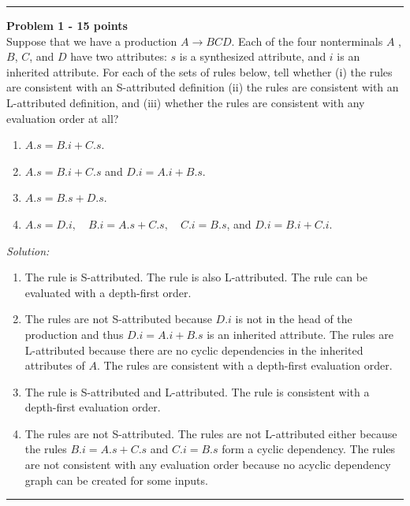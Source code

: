 \documentclass[a4paper, 11pt]{article}
\newenvironment{problem}[2][Problem]
    { \begin{mdframed}[backgroundcolor=gray!20] \textbf{#1 #2} \\}
    {  \end{mdframed}}
\newenvironment{solution}
    {\textit{Solution:}}
    {}
\begin{document}
\noindent\rule{7in}{2.8pt}
\begin{problem}{1 - 15 points}
Suppose that we have a production $A \rightarrow BCD$. Each of  the four nonterminals $A$ , $B$, $C$, and $D$ have two attributes: $s$ is a synthesized  attribute, and $i$ is an inherited attribute. For each of the sets of rules below,  tell whether (i) the rules are consistent with an S-attributed definition (ii) the  rules are consistent with an L-attributed definition, and (iii) whether the rules  are consistent with any evaluation order at all?  

\begin{enumerate}[a]
    \item $A.s = B.i + C.s.$  
    \item $A.s = B.i + C.s$ and $D.i = A.i + B.s.$  
    \item $A.s = B.s + D.s.$
    \item $A.s = D.i, \quad B.i = A.s + C.s, \quad C.i = B.s$, and $D.i = B.i + C.i.$ 
\end{enumerate}
    
\end{problem}
\begin{solution}

\begin{enumerate}[a]
    \item The rule is S-attributed. The rule is also L-attributed. The rule can be evaluated with a depth-first order.
    \item The rules are not S-attributed because $D.i$ is not in the head of the production and thus $D.i = A.i + B.s$ is an inherited attribute. The rules are L-attributed because there are no cyclic dependencies in the inherited attributes of $A$. The rules are consistent with a depth-first evaluation order.
    \item The rule is S-attributed and L-attributed. The rule is consistent with a depth-first evaluation order.
    \item The rules are not S-attributed. The rules are not L-attributed either because the rules $B.i = A.s + C.s$ and $C.i = B.s$ form a cyclic dependency. The rules are not consistent with any evaluation order because no acyclic dependency graph can be created for some inputs.
\end{enumerate}
\end{solution} 
\noindent\rule{7in}{2.8pt}
\end{document}
